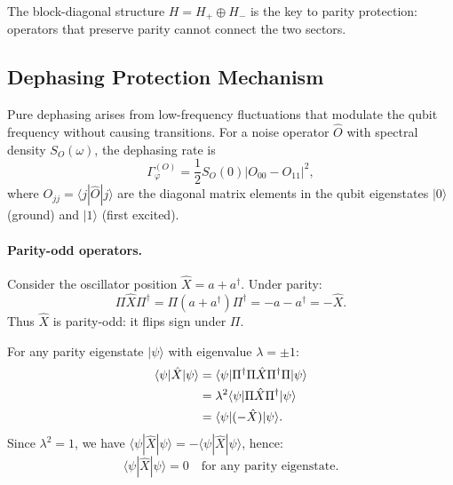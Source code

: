 \documentclass[reprint, floatfix, superscriptaddress, amsmath, amssymb, longbibliography]{revtex4-2}
\begin{document}
The block-diagonal structure $H = H_+ \oplus H_-$ is the key to parity protection: operators that preserve parity cannot connect the two sectors.

\subsection{Dephasing Protection Mechanism}
\label{sec:dephasing_mechanism}

Pure dephasing arises from low-frequency fluctuations that modulate the qubit frequency without causing transitions. For a noise operator $\hat{O}$ with spectral density $S_O(\omega)$, the dephasing rate is
\begin{equation}
\Gamma_\varphi^{(O)} = \frac{1}{2}S_O(0)|O_{00} - O_{11}|^2,
\label{eq:dephasing_general}
\end{equation}
where $O_{jj} = \langle j|\hat{O}|j\rangle$ are the diagonal matrix elements in the qubit eigenstates $|0\rangle$ (ground) and $|1\rangle$ (first excited).

\paragraph{Parity-odd operators.} Consider the oscillator position $\hat{X} = a + a^\dagger$. Under parity:
\begin{equation}
\Pi\hat{X}\Pi^\dagger = \Pi(a + a^\dagger)\Pi^\dagger = -a - a^\dagger = -\hat{X}.
\label{eq:X_odd}
\end{equation}
Thus $\hat{X}$ is parity-odd: it flips sign under $\Pi$.

For any parity eigenstate $|\psi\rangle$ with eigenvalue $\lambda = \pm 1$:
\begin{align}
\langle\psi|\hat{X}|\psi\rangle &= \langle\psi|\Pi^\dagger\Pi\hat{X}\Pi^\dagger\Pi|\psi\rangle \notag \\
&= \lambda^2 \langle\psi|\Pi\hat{X}\Pi^\dagger|\psi\rangle \notag \\
&= \langle\psi|(-\hat{X})|\psi\rangle.
\label{eq:X_vanish_proof}
\end{align}
Since $\lambda^2 = 1$, we have $\langle\psi|\hat{X}|\psi\rangle = -\langle\psi|\hat{X}|\psi\rangle$, hence:
\begin{equation}
\boxed{\langle\psi|\hat{X}|\psi\rangle = 0 \quad \text{for any parity eigenstate.}}
\label{eq:X_vanish}
\end{equation}
\end{document}
